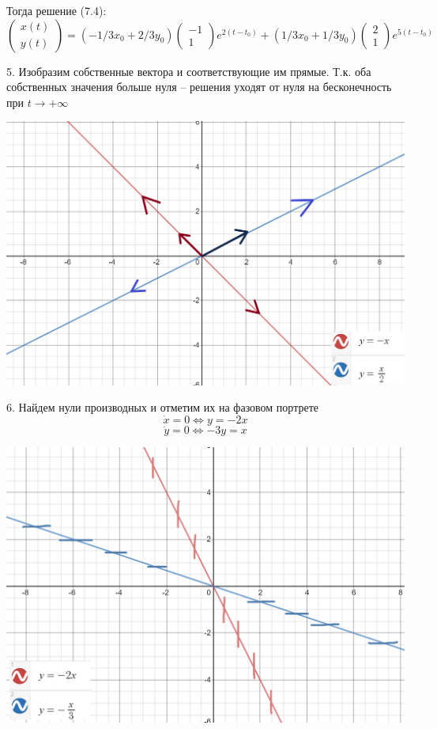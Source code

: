 \documentclass[10pt]{report}
\begin{document}
Тогда решение (7.4):
\[\left(
\begin{array}{c}
x(t)\\
y(t)
\end{array}
\right)
=(-1/3x_{0}+2/3y_{0})
\left(
\begin{array}{c}
-1\\
1
\end{array}
\right)
e^{2(t-t_0)}+(1/3x_{0}+1/3y_{0})
\left(
\begin{array}{c}
2\\
1
\end{array}
\right)
e^{5(t-t_0)}
\]

5. Изобразим собственные вектора и соответствующие им прямые. Т.к. оба собственных значения больше нуля -- решения уходят от нуля на бесконечность при $t \rightarrow +\infty$
\begin{center}
{\includegraphics[scale=0.4]{graph7.5.png}} 
\end{center}

6. Найдем нули производных и отметим их на фазовом портрете\[ \dot{x}=0 \Leftrightarrow y=-2x\]
\[ \dot{y}=0 \Leftrightarrow -3y=x\]
\begin{center}
{\includegraphics[scale=0.4]{graph7.6.png}} 
\end{center}
\end{document}
